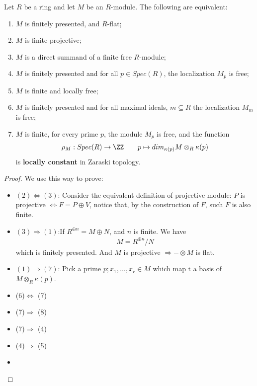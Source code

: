 \documentclass[Total.tex]{subfiles}
\begin{document}
			\begin{lemma}
				Let $R$ be a ring and let $M$ be an $R$-module. The following are equivalent:
				\begin{enumerate}
					\item $M$ is finitely presented, and $R$-flat;
					\item $M$ is finite projective;
					\item $M$ is a direct summand of a finite free $R$-module;
					\item $M$ is finitely presented and for all $p\in Spec(R)$, the localization $M_p$ is free;
					\item $M$ is finite and locally free;
					\item $M$ is finitely presented and for all maximal ideals, $m\subseteq R$ the localization $M_m$ is free;
					\item $M$ is finite, for every prime $p$, the module $M_p$ is free, and the function
					\begin{gather*}
						\rho_M:Spec(R)\rightarrow \ZZ\qquad p\mapsto dim_{\kappa(p)} M\otimes_R \kappa(p)
					\end{gather*}
					is \textbf{locally constant} in Zaraski topology.
				\end{enumerate}
			\end{lemma}
			\begin{proof}
				We use this way to prove:
				\begin{center}
				\end{center}
				\begin{itemize}
					\item $(2)\Leftrightarrow (3)$: Consider the equivalent definition of projective module: $P$ is projective $\Leftrightarrow F=P\oplus V$, notice that, by the construction of $F$, such $F$ is also finite.
					\item $(3)\Rightarrow (1)$:If $R^{\oplus n}=M\oplus N$, and $n$ is finite. We have
					\begin{gather*}
						M=R^{\oplus n}/N
					\end{gather*}
					which is finitely presented. And $M$ is projective $\Rightarrow -\otimes M$ is flat.  
					\item $(1)\Rightarrow (7)$: Pick a prime $p;x_1,\dots,x_r\in M$ which map t a basis of $M\otimes_R \kappa(p)$.
					\item (6)$\Leftrightarrow$ (7)
					\item (7)$\Rightarrow$ (8)
					\item (7)$\Rightarrow$ (4)
					\item (4)$\Rightarrow$ (5)
					\item 
				\end{itemize}
			\end{proof}
			
\end{document}
